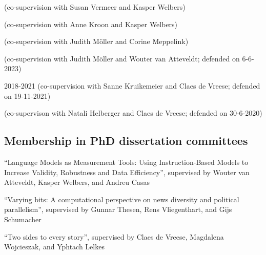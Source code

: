 \documentclass[11pt,a4paper,sans]{moderncv}
\begin{document}
(co-supervision with Susan Vermeer and Kasper Welbers) \newline

(co-supervision with Anne Kroon and Kasper Welbers) \newline

(co-supervision with Judith M\"oller and Corine Meppelink) \newline

(co-supervision with Judith M\"oller and Wouter van Atteveldt; defended on 6-6-2023) \newline

 {2018-2021}
(co-supervision with Sanne Kruikemeier and Claes de Vreese; defended on 19-11-2021) \newline

(co-supervison with Natali Helberger and Claes de Vreese; defended on 30-6-2020) \newline



\subsection{Membership in PhD dissertation committees}
``Language Models as Measurement Tools: Using Instruction-Based Models to Increase Validity, Robustness and Data Efficiency'', supervised by Wouter van Atteveldt, Kasper Welbers, and Andreu Casas \newline

``Varying bits: A computational perspective on news diversity and political parallelism'', supervised by Gunnar Thesen, Rens Vliegenthart, and Gijs Schumacher \newline

``Two sides to every story'', supervised by Claes de Vreese, Magdalena Wojcieszak, and Yphtach Lelkes \newline
\end{document}
